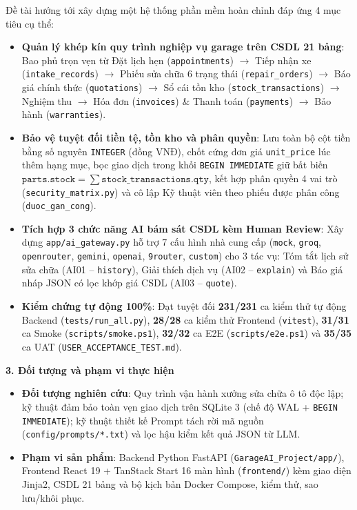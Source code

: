 Đề tài hướng tới xây dựng một hệ thống phần mềm hoàn chỉnh đáp ứng 4 mục tiêu cụ thể:
\begin{itemize}[noitemsep,topsep=2pt]
  \item \textbf{Quản lý khép kín quy trình nghiệp vụ garage trên CSDL 21 bảng}: Bao phủ trọn vẹn từ Đặt lịch hẹn (\texttt{appointments}) $\rightarrow$ Tiếp nhận xe (\texttt{intake\_records}) $\rightarrow$ Phiếu sửa chữa 6 trạng thái (\texttt{repair\_orders}) $\rightarrow$ Báo giá chính thức (\texttt{quotations}) $\rightarrow$ Sổ cái tồn kho (\texttt{stock\_transactions}) $\rightarrow$ Nghiệm thu $\rightarrow$ Hóa đơn (\texttt{invoices}) \& Thanh toán (\texttt{payments}) $\rightarrow$ Bảo hành (\texttt{warranties}).
  \item \textbf{Bảo vệ tuyệt đối tiền tệ, tồn kho và phân quyền}: Lưu toàn bộ cột tiền bằng số nguyên \texttt{INTEGER} (đồng VNĐ), chốt cứng đơn giá \texttt{unit\_price} lúc thêm hạng mục, bọc giao dịch trong khối \texttt{BEGIN IMMEDIATE} giữ bất biến $\texttt{parts.stock} = \sum \texttt{stock\_transactions.qty}$, kết hợp phân quyền 4 vai trò (\texttt{security\_matrix.py}) và cô lập Kỹ thuật viên theo phiếu được phân công (\texttt{duoc\_gan\_cong}).
  \item \textbf{Tích hợp 3 chức năng AI bám sát CSDL kèm Human Review}: Xây dựng \texttt{app/ai\_gateway.py} hỗ trợ 7 cấu hình nhà cung cấp (\texttt{mock}, \texttt{groq}, \texttt{openrouter}, \texttt{gemini}, \texttt{openai}, \texttt{9router}, \texttt{custom}) cho 3 tác vụ: Tóm tắt lịch sử sửa chữa (AI01 -- \texttt{history}), Giải thích dịch vụ (AI02 -- \texttt{explain}) và Báo giá nháp JSON có lọc khớp giá CSDL (AI03 -- \texttt{quote}).
  \item \textbf{Kiểm chứng tự động 100\%}: Đạt tuyệt đối \textbf{231/231} ca kiểm thử tự động Backend (\texttt{tests/run\_all.py}), \textbf{28/28} ca kiểm thử Frontend (\texttt{vitest}), \textbf{31/31} ca Smoke (\texttt{scripts/smoke.ps1}), \textbf{32/32} ca E2E (\texttt{scripts/e2e.ps1}) và \textbf{35/35} ca UAT (\texttt{USER\_ACCEPTANCE\_TEST.md}).
\end{itemize}

\textbf{3. Đối tượng và phạm vi thực hiện}

\begin{itemize}[noitemsep,topsep=2pt]
  \item \textbf{Đối tượng nghiên cứu}: Quy trình vận hành xưởng sửa chữa ô tô độc lập; kỹ thuật đảm bảo toàn vẹn giao dịch trên SQLite 3 (chế độ WAL + \texttt{BEGIN IMMEDIATE}); kỹ thuật thiết kế Prompt tách rời mã nguồn (\texttt{config/prompts/*.txt}) và lọc hậu kiểm kết quả JSON từ LLM.
  \item \textbf{Phạm vi sản phẩm}: Backend Python FastAPI (\texttt{GarageAI\_Project/app/}), Frontend React 19 + TanStack Start 16 màn hình (\texttt{frontend/}) kèm giao diện Jinja2, CSDL 21 bảng và bộ kịch bản Docker Compose, kiểm thử, sao lưu/khôi phục.
\end{itemize}

